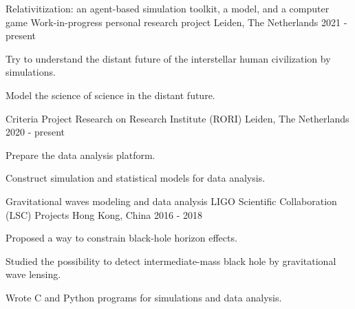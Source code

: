 

\begin{cventries}

  \cventry
    {Relativitization: an agent-based simulation toolkit, a model, and a computer game} %
    {Work-in-progress personal research project} %
    {Leiden, The Netherlands} %
    {2021 - present} %
    {
      \begin{cvitems} %
        \item {Try to understand the distant future of the interstellar human civilization by simulations.}
        \item {Model the science of science in the distant future.}
      \end{cvitems}
    }

  \cventry
    {Criteria Project} %
    {Research on Research Institute (RORI)} %
    {Leiden, The Netherlands} %
    {2020 - present} %
    {
      \begin{cvitems} %
        \item {Prepare the data analysis platform.}
        \item {Construct simulation and statistical models for data analysis.}
      \end{cvitems}
    }

  \cventry
    {Gravitational waves modeling and data analysis} %
    {LIGO Scientific Collaboration (LSC) Projects} %
    {Hong Kong, China} %
    {2016 - 2018} %
    {
      \begin{cvitems} %
        \item {Proposed a way to constrain black-hole horizon effects.}
        \item {Studied the possibility to detect intermediate-mass black hole by gravitational wave lensing.}
        \item {Wrote C and Python programs for simulations and data analysis.}
      \end{cvitems}
    }


\end{cventries}

